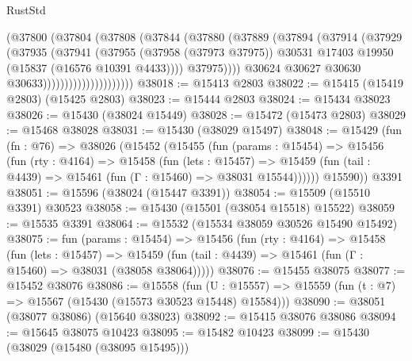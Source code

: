 \begin{lexlean}{RustStd}
\begin{coremodule}
                                  (@37800
                                    (@37804
                                      (@37808
                                        (@37844
                                          (@37880
                                            (@37889
                                              (@37894
                                                (@37914
                                                  (@37929
                                                    (@37935
                                                      (@37941
                                                        (@37955
                                                          (@37958 (@37973 @37975))
                                                          @30531
                                                          @17403
                                                          @19950
                                                          (@15837 (@16576 @10391 @4433))))
                                                      @37975))))
                                              @30624
                                              @30627
                                              @30630
                                              @30633)))))))))))))))))))))
@38018 := @15413 @2803
@38022 := @15415 (@15419 @2803) (@15425 @2803)
@38023 := @15444 @2803
@38024 := @15434 @38023
@38026 := @15430 (@38024 @15449)
@38028 := @15472 (@15473 @2803)
@38029 := @15468 @38028
@38031 := @15430 (@38029 @15497)
@38048 := @15429
    (fun (fn : @76) =>
    @38026
      (@15452
        (@15455
          (fun (params : @15454) =>
          @15456
            (fun (rty : @4164) =>
            @15458
              (fun (lets : @15457) =>
              @15459 (fun (tail : @4439) => @15461 (fun (Γ : @15460) => @38031 @15544))))))
        @15590))
    @3391
@38051 := @15596 (@38024 (@15447 @3391))
@38054 := @15509 (@15510 @3391) @30523
@38058 := @15430 (@15501 (@38054 @15518) @15522)
@38059 := @15535 @3391
@38064 := @15532 (@15534 @38059 @30526 @15490 @15492)
@38075 := fun (params : @15454) =>
  @15456
    (fun (rty : @4164) =>
    @15458
      (fun (lets : @15457) =>
      @15459 (fun (tail : @4439) => @15461 (fun (Γ : @15460) => @38031 (@38058 @38064)))))
@38076 := @15455 @38075
@38077 := @15452 @38076
@38086 := @15558
    (fun (U : @15557) => @15559 (fun (t : @7) => @15567 (@15430 (@15573 @30523 @15448) @15584)))
@38090 := @38051 (@38077 @38086) (@15640 @38023)
@38092 := @15415 @38076 @38086
@38094 := @15645 @38075 @10423
@38095 := @15482 @10423
@38099 := @15430 (@38029 (@15480 (@38095 @15495)))

\end{coremodule}
\end{lexlean}
